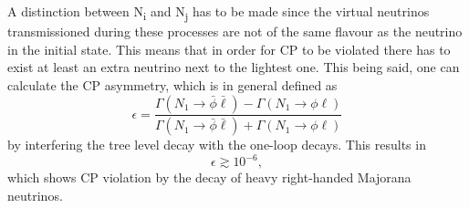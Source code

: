 A distinction between N\textsubscript{i} and N\textsubscript{j} has to be made since the virtual neutrinos transmissioned during these processes are not of the same flavour as the neutrino in the initial state. This means that in order for CP to be violated there has to exist at least an extra neutrino next to the lightest one. \newline\indent
This being said, one can calculate the CP asymmetry\cite[pp. 24ff.]{Davidson:2008bu}, which is in general defined as
\begin{equation}
	\epsilon=\frac{\Gamma(N_1\rightarrow\bar{\phi}\bar{\ell})-\Gamma(N_1\rightarrow\phi\ell)}{\Gamma(N_1\rightarrow\bar{\phi}\bar{\ell})+\Gamma(N_1\rightarrow\phi\ell)}
	\label{eq:CP_violation}
\end{equation}
by interfering the tree level decay with the one-loop decays. This results in \cite[p. 26]{Davidson:2008bu}
\begin{equation}
	\epsilon\gtrsim10^{-6},
	\label{eq:CP_value}
\end{equation}
which shows CP violation by the decay of heavy right-handed Majorana neutrinos. 
